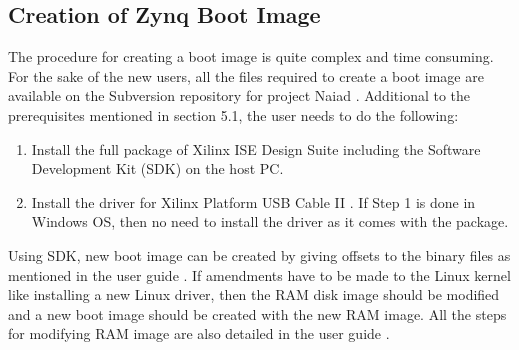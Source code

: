 \subsection{Creation of Zynq Boot Image}
The procedure for creating a boot image is quite complex and time consuming. For the sake of the new users, all the files required to create a boot image are available on the Subversion repository for project Naiad \cite{svnGimme}. Additional to the prerequisites mentioned in section 5.1, the user needs to do the following:\begin{enumerate}
\item Install the full package of Xilinx ISE Design Suite\cite{downloadISE} including the Software Development Kit (SDK) on the host PC.
\item Install the driver for Xilinx Platform USB Cable II \cite{driverCable}. If Step 1 is done in Windows OS, then no need to install the driver as it comes with the package.
\end{enumerate}

Using SDK, new boot image can be created by giving offsets to the binary files as mentioned in the user guide \cite{svnGimme}. If amendments have to be made to the Linux kernel like installing a new Linux driver, then the RAM disk image should be modified and a new boot image should be created with the new RAM image. All the steps for modifying RAM image are also detailed in the user guide \cite{svnGimme}.
